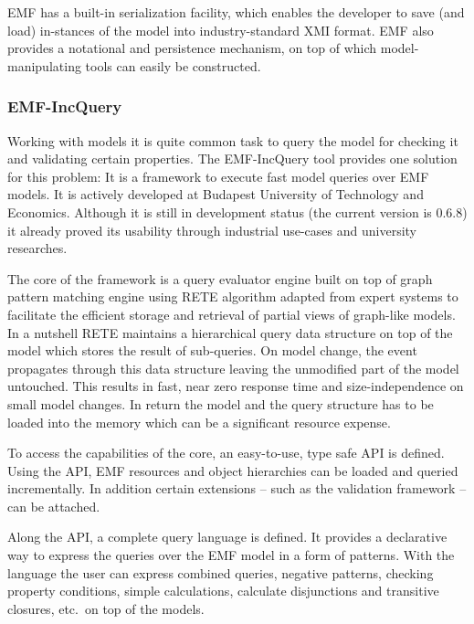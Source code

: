 EMF has a built-in serialization facility, which enables the developer to save
(and load) in-stances of the model into industry-standard XMI format. EMF also
provides a notational and persistence mechanism, on top of which
model-manipulating tools can easily be constructed.


\subsubsection{EMF-IncQuery} 
Working with models it is quite common task to query the model for checking it and
validating certain properties. The EMF-IncQuery \cite{EMFIncQuery} tool provides
one solution for this problem: It is a framework to execute fast model queries
over EMF models. It is actively developed at Budapest University of Technology
and Economics. Although it is still in development status (the current version
is 0.6.8) it already proved its usability through industrial use-cases and
university researches. %


The core of the framework is a query evaluator engine built on top of graph
pattern matching engine using RETE \cite{RETE} algorithm adapted from expert
systems to facilitate the efficient storage and retrieval of partial views of
graph-like models. In a nutshell RETE maintains a hierarchical query data
structure on top of the model which stores the result of sub-queries. On model
change, the event propagates through this data structure leaving the unmodified
part of the model untouched. This results in fast, near zero response time and
size-independence on small model changes. In return the model and the query
structure has to be loaded into the memory which can be a significant resource
expense.

To access the capabilities of the core, an easy-to-use, type safe API is
defined. Using the API, EMF resources and object hierarchies can be loaded and
queried incrementally. In addition certain extensions -- such as the validation
framework -- can be attached.

Along the API, a complete query language is defined. It provides a declarative
way to express the queries over the EMF model in a form of patterns. With the
language the user can express combined queries, negative patterns, checking
property conditions, simple calculations, calculate disjunctions and transitive
closures, etc.~on top of the models.

